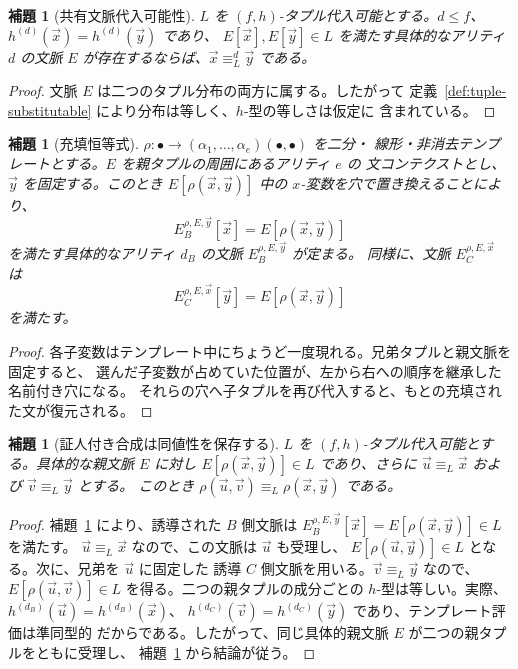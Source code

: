 \documentclass[11pt,a4paper]{ltjsarticle}
\newtheorem{lemma}[theorem]{補題}
\theoremstyle{remark}
\newcommand{\tuple}[1]{\vec{#1}}
\begin{document}
\begin{lemma}[共有文脈代入可能性]
\label{lem:shared-context}
\(L\) を \((f,h)\)-タプル代入可能とする。\(d\le f\)、
\(h^{(d)}(\tuple x)=h^{(d)}(\tuple y)\) であり、
\(E[\tuple x],E[\tuple y]\in L\) を満たす具体的なアリティ \(d\) の文脈 \(E\)
が存在するならば、\(\tuple x\equiv_L^d\tuple y\) である。
\end{lemma}

\begin{proof}
文脈 \(E\) は二つのタプル分布の両方に属する。したがって
定義~\ref{def:tuple-substitutable} により分布は等しく、\(h\)-型の等しさは仮定に
含まれている。
\end{proof}

\begin{lemma}[充填恒等式]
\label{lem:filling-identity}
\(\rho\colon\bullet\to(\alpha_1,\ldots,\alpha_e)(\bullet,\bullet)\) を二分・
線形・非消去テンプレートとする。\(E\) を親タプルの周囲にあるアリティ \(e\) の
文コンテクストとし、\(\tuple y\) を固定する。このとき
\(E[\rho(\tuple x,\tuple y)]\) 中の \(x\)-変数を穴で置き換えることにより、
\[
E_B^{\rho,E,\tuple y}[\tuple x]=E[\rho(\tuple x,\tuple y)]
\]
を満たす具体的なアリティ \(d_B\) の文脈 \(E_B^{\rho,E,\tuple y}\) が定まる。
同様に、文脈 \(E_C^{\rho,E,\tuple x}\) は
\[
E_C^{\rho,E,\tuple x}[\tuple y]=E[\rho(\tuple x,\tuple y)]
\]
を満たす。
\end{lemma}

\begin{proof}
各子変数はテンプレート中にちょうど一度現れる。兄弟タプルと親文脈を固定すると、
選んだ子変数が占めていた位置が、左から右への順序を継承した名前付き穴になる。
それらの穴へ子タプルを再び代入すると、もとの充填された文が復元される。
\end{proof}

\begin{lemma}[証人付き合成は同値性を保存する]
\label{lem:witnessed-composition}
\(L\) を \((f,h)\)-タプル代入可能とする。具体的な親文脈 \(E\) に対し
\(E[\rho(\tuple x,\tuple y)]\in L\) であり、さらに
\(\tuple u\equiv_L\tuple x\) および \(\tuple v\equiv_L\tuple y\) とする。
このとき
\(\rho(\tuple u,\tuple v)\equiv_L\rho(\tuple x,\tuple y)\) である。
\end{lemma}

\begin{proof}
補題~\ref{lem:filling-identity} により、誘導された \(B\) 側文脈は
\(E_B^{\rho,E,\tuple y}[\tuple x]=E[\rho(\tuple x,\tuple y)]\in L\) を満たす。
\(\tuple u\equiv_L\tuple x\) なので、この文脈は \(\tuple u\) も受理し、
\(E[\rho(\tuple u,\tuple y)]\in L\) となる。次に、兄弟を \(\tuple u\) に固定した
誘導 \(C\) 側文脈を用いる。\(\tuple v\equiv_L\tuple y\) なので、
\(E[\rho(\tuple u,\tuple v)]\in L\) を得る。二つの親タプルの成分ごとの
\(h\)-型は等しい。実際、
\(h^{(d_B)}(\tuple u)=h^{(d_B)}(\tuple x)\)、
\(h^{(d_C)}(\tuple v)=h^{(d_C)}(\tuple y)\) であり、テンプレート評価は準同型的
だからである。したがって、同じ具体的親文脈 \(E\) が二つの親タプルをともに受理し、
補題~\ref{lem:shared-context} から結論が従う。
\end{proof}
\end{document}
